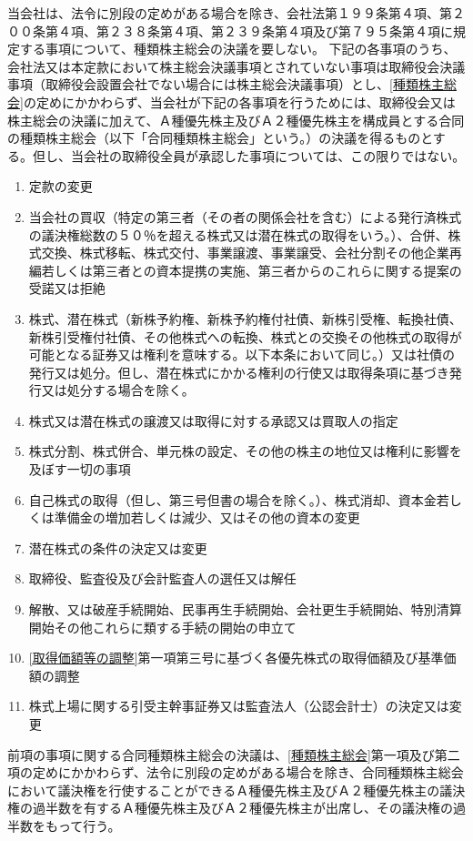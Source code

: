 \documentclass[10pt,a4paper,uplatex]{jsarticle}
\begin{document}
\term 当会社は、法令に別段の定めがある場合を除き、会社法第１９９条第４項、第２００条第４項、第２３８条第４項、第２３９条第４項及び第７９５条第４項に規定する事項について、種類株主総会の決議を要しない。
下記の各事項のうち、会社法又は本定款において株主総会決議事項とされていない事項は取締役会決議事項（取締役会設置会社でない場合には株主総会決議事項）とし、\ref{種類株主総会}の定めにかかわらず、当会社が下記の各事項を行うためには、取締役会又は株主総会の決議に加えて、Ａ種優先株主及びＡ２種優先株主を構成員とする合同の種類株主総会（以下「合同種類株主総会」という。）の決議を得るものとする。但し、当会社の取締役全員が承認した事項については、この限りではない。
\begin{enumerate}
\item 定款の変更
\item 当会社の買収（特定の第三者（その者の関係会社を含む）による発行済株式の議決権総数の５０％を超える株式又は潜在株式の取得をいう。）、合併、株式交換、株式移転、株式交付、事業譲渡、事業譲受、会社分割その他企業再編若しくは第三者との資本提携の実施、第三者からのこれらに関する提案の受諾又は拒絶
\item 株式、潜在株式（新株予約権、新株予約権付社債、新株引受権、転換社債、新株引受権付社債、その他株式への転換、株式との交換その他株式の取得が可能となる証券又は権利を意味する。以下本条において同じ。）又は社債の発行又は処分。但し、潜在株式にかかる権利の行使又は取得条項に基づき発行又は処分する場合を除く。
\item 株式又は潜在株式の譲渡又は取得に対する承認又は買取人の指定
\item 株式分割、株式併合、単元株の設定、その他の株主の地位又は権利に影響を及ぼす一切の事項
\item 自己株式の取得（但し、第三号但書の場合を除く。）、株式消却、資本金若しくは準備金の増加若しくは減少、又はその他の資本の変更
\item 潜在株式の条件の決定又は変更
\item 取締役、監査役及び会計監査人の選任又は解任
\item 解散、又は破産手続開始、民事再生手続開始、会社更生手続開始、特別清算開始その他これらに類する手続の開始の申立て
\item \ref{取得価額等の調整}第一項第三号に基づく各優先株式の取得価額及び基準価額の調整
\item 株式上場に関する引受主幹事証券又は監査法人（公認会計士）の決定又は変更
\end{enumerate}
\term 前項の事項に関する合同種類株主総会の決議は、\ref{種類株主総会}第一項及び第二項の定めにかかわらず、法令に別段の定めがある場合を除き、合同種類株主総会において議決権を行使することができるＡ種優先株主及びＡ２種優先株主の議決権の過半数を有するＡ種優先株主及びＡ２種優先株主が出席し、その議決権の過半数をもって行う。
\end{document}
